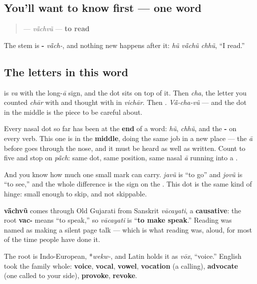 \subsection*{You'll want to know first — one word}
\begin{quote}
\textbf{} — \emph{vā̃chvũ} — \textbf{to read}
\end{quote}

The stem is \textbf{-} \emph{vā̃ch-}, and nothing new happens after it: \emph{hũ vā̃chũ chhũ}, \textquotedblleft{}I read.\textquotedblright{}

\subsection*{The letters in this word}
\textbf{} is \textbf{} \emph{va} with the long-\emph{ā} sign, and the dot \textbf{} sits on top of it. Then \textbf{} \emph{cha}, the letter you counted \emph{chār} with and thought with in \emph{vichār}. Then \textbf{}. \emph{Vā̃-cha-vũ} — and the dot in the middle is the piece to be careful about.

\begin{grammarlens}[title={What you've built: a nasal that is not at the end}]
Every nasal dot so far has been at the \textbf{end} of a word: \emph{hũ}, \emph{chhũ}, and the \textbf{-} on every verb. This one is in the \textbf{middle}, doing the same job in a new place — the \emph{ā} before \textbf{} goes through the nose, and it must be heard as well as written. Count to five and stop on \textbf{} \emph{pā̃ch}: same dot, same position, same nasal \emph{ā} running into a \textbf{}.

And you know how much one small mark can carry. \textbf{} \emph{javũ} is \textquotedblleft{}to go\textquotedblright{} and \textbf{} \emph{jovũ} is \textquotedblleft{}to see,\textquotedblright{} and the whole difference is the sign on the \textbf{}. This dot is the same kind of hinge: small enough to skip, and not skippable.
\end{grammarlens}

\begin{cousinweb}
\textbf{vā̃chvũ} comes through Old Gujarati from Sanskrit \emph{vācayati}, a \textbf{causative}: the root \textbf{vac-} means \textquotedblleft{}to speak,\textquotedblright{} so \emph{vācayati} is \textquotedblleft{}\textbf{to make speak}.\textquotedblright{} Reading was named as making a silent page talk — which is what reading was, aloud, for most of the time people have done it.

The root is Indo-European, *\emph{wekw-}, and Latin holds it as \emph{vōx}, \textquotedblleft{}voice.\textquotedblright{} English took the family whole: \textbf{voice}, \textbf{vocal}, \textbf{vowel}, \textbf{vocation} (a calling), \textbf{advocate} (one called to your side), \textbf{provoke}, \textbf{revoke}.
\end{cousinweb}

